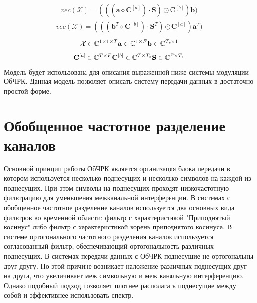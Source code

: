 \begin{align}
vec(\mathcal{X})=(((\mathbf{a}\diamond \mathbf{C}^{[a]}) \cdot \mathbf{S}) \odot \mathbf{C}^{[b]} )\mathbf{b})
\label{p_8}
\end{align}
\begin{align}
vec(\mathcal{X})=(((\mathbf{b}^T\diamond \mathbf{C}^{[b]}) \cdot \mathbf{S}^T) \odot \mathbf{C}^{[a]}) \mathbf{a}^T) 
\label{p_9}
\end{align}
\begin{align*}
\mathcal{X} \in \mathbb{C}^{1 \times 1 \times T} 
\mathbf{a} \in \mathbb{C}^{1 \times F} 
\mathbf{b} \in \mathbb{C}^{T_s \times 1}
\end{align*}
\begin{align*}
\mathbf{C}^{[a]} \in \mathbb{C}^{T \times F}
\mathbf{C}^{[b]} \in \mathbb{C}^{T \times T_s}
\mathbf{S} \in \mathbb{C}^{F \times T_s}
\end{align*}
Модель будет использована для описания выраженной ниже системы модуляции ОбЧРК. Данная модель позволяет описать систему передачи данных в достаточно простой форме. 
\section{Обобщенное частотное разделение каналов}
Основной принцип работы ОбЧРК является организация блока передачи в котором используется несколько поднесущих и несколько символов на каждой из поднесущих. При этом символы на поднесущих проходят низкочастотную фильтрацию для уменьшения межканальной интерференции. В системах с обобщенное частотное разделение каналов используется два основных вида фильтров во временной области: фильтр с характеристикой "Приподнятый косинус" либо фильтр с характеристикой корень приподнятого косинуса. В системе ортогонального частотного разделения каналов используется согласованный фильтр, обеспечивающий ортогональность различных поднесущих. В системах передачи данных с ОбЧРК поднесущие не ортогональны друг другу. По этой причине возникает наложение различных поднесущих друг на друга, что увеличивает меж символьную и меж канальную интерференцию. Однако подобный подход позволяет плотнее располагать поднесущие между собой и эффективнее использовать спектр.
